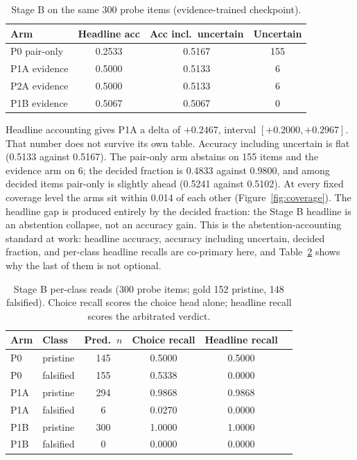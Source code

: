 \documentclass{article} %
\begin{document}
\begin{table}[t]
\centering
\small
\caption{Stage B on the same 300 probe items (evidence-trained checkpoint).}
\label{tab:stageb}
\begin{tabular}{lccc}
\toprule
Arm & Headline acc & Acc incl.\ uncertain & Uncertain \\
\midrule
P0 pair-only & 0.2533 & 0.5167 & 155 \\
P1A evidence & 0.5000 & 0.5133 & 6 \\
P2A evidence & 0.5000 & 0.5133 & 6 \\
P1B evidence & 0.5067 & 0.5067 & 0 \\
\bottomrule
\end{tabular}
\end{table}

Headline accounting gives P1A a delta of \(+0.2467\), interval \([+0.2000, +0.2967]\). That number does not survive its own table. Accuracy including uncertain is flat (0.5133 against 0.5167). The pair-only arm abstains on 155 items and the evidence arm on 6; the decided fraction is 0.4833 against 0.9800, and among decided items pair-only is slightly ahead (0.5241 against 0.5102). At every fixed coverage level the arms sit within 0.014 of each other (Figure~\ref{fig:coverage}). The headline gap is produced entirely by the decided fraction: the Stage B headline is an abstention collapse, not an accuracy gain. This is the abstention-accounting standard at work: headline accuracy, accuracy including uncertain, decided fraction, and per-class headline recalls are co-primary here, and Table~\ref{tab:stagebclass} shows why the last of them is not optional.

\begin{table}[t]
\centering
\small
\caption{Stage B per-class reads (300 probe items; gold 152 pristine, 148 falsified). Choice recall scores the choice head alone; headline recall scores the arbitrated verdict.}
\label{tab:stagebclass}
\begin{tabular}{llcccc}
\toprule
Arm & Class & Pred.\ \(n\) & Choice recall & Headline recall \\
\midrule
P0 & pristine & 145 & 0.5000 & 0.5000 \\
P0 & falsified & 155 & 0.5338 & 0.0000 \\
P1A & pristine & 294 & 0.9868 & 0.9868 \\
P1A & falsified & 6 & 0.0270 & 0.0000 \\
P1B & pristine & 300 & 1.0000 & 1.0000 \\
P1B & falsified & 0 & 0.0000 & 0.0000 \\
\bottomrule
\end{tabular}
\end{table}
\end{document}
